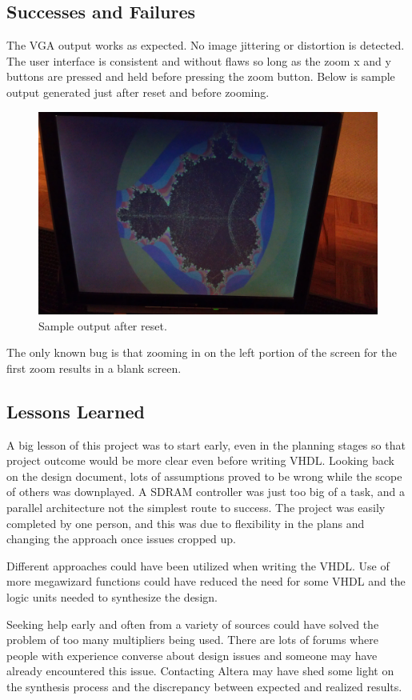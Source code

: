 \documentclass[titlepage]{article}      %
\begin{document}
\subsection{Successes and Failures}
The VGA output works as expected. No image jittering or distortion is detected. The user interface is consistent and without flaws so long as the zoom x and y buttons are pressed and held before pressing the zoom button. Below is sample output generated just after reset and before zooming.
\begin{figure}[H]
\centering
\includegraphics[width=5in]{output}
\caption{Sample output after reset.}
\end{figure}
The only known bug is that zooming in on the left portion of the screen for the first zoom results in a blank screen.
\subsection{Lessons Learned}
A big lesson of this project was to start early, even in the planning stages so that project outcome would be more clear even before writing VHDL. Looking back on the design document, lots of assumptions proved to be wrong while the scope of others was downplayed. A SDRAM controller was just too big of a task, and a parallel architecture not the simplest route to success. The project was easily completed by one person, and this was due to flexibility in the plans and changing the approach once issues cropped up.

Different approaches could have been utilized when writing the VHDL. Use of more megawizard functions could have reduced the need for some VHDL and the logic units needed to synthesize the design. 

Seeking help early and often from a variety of sources could have solved the problem of too many multipliers being used. There are lots of forums where people with experience converse about design issues and someone may have already encountered this issue. Contacting Altera may have shed some light on the synthesis process and the discrepancy between expected and realized results.
\end{document}
